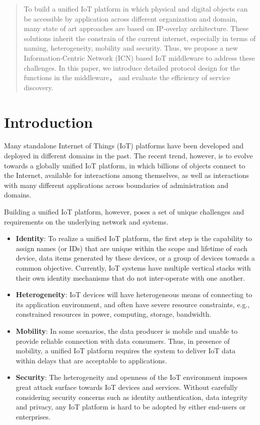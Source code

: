 \begin{abstract}
To build a unified IoT platform in which physical and digital objects can be accessible by application across different organization and domain, many state of art approaches are based on IP-overlay architecture. These solutions inherit the constrain of the current internet, especially in terms of naming, heterogeneity, mobility and security. Thus, we propose a new Information-Centric Network (ICN) based IoT middleware to address these challenges. In this paper, we introduce detailed protocol design for the functions in the middleware， and evaluate the efficiency of service discovery.
\end{abstract}

\section{Introduction}
Many standalone Internet of Things (IoT) platforms have been developed and deployed in different domains in the past. The recent trend, however, is to evolve towards a globally unified IoT platform, in which billions of objects connect to the Internet, available for interactions among themselves, as well as interactions with many different applications across boundaries of administration and domains.


Building a unified IoT platform, however, poses a set of unique challenges and requirements on the underlying network and systems.
\begin{itemize}
\vspace{1mm}\item{\bf Identity}:
To realize a unified IoT platform, the first step is the capability to assign names (or IDs) that are unique within the scope and lifetime of each device, data items generated by these devices, or a group of devices towards a common objective. Currently, IoT systems have multiple vertical stacks with their own identity mechanisms that do not inter-operate with one another.

\vspace{1mm}\item{\bf Heterogeneity}:
IoT devices will have heterogeneous means of connecting to its application environment, and often have severe resource constraints, e.g., constrained resources in power, computing, storage, bandwidth.

\vspace{1mm}\item{\bf Mobility}:
In some scenarios, the data producer is mobile and unable to provide reliable connection with data consumers. Thus, in presence of mobility, a unified IoT platform requires the system to deliver IoT data within delays that are acceptable to applications.

\vspace{1mm}\item{\bf Security}:
The heterogeneity and openness of the IoT environment imposes great attack surface towards IoT devices and services. Without carefully considering security concerns such as identity authentication, data integrity and privacy, any IoT platform is hard to be adopted by either end-users or enterprises.
\end{itemize}

